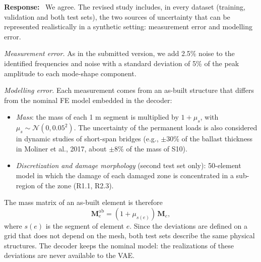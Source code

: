 \documentclass[11pt]{article}
\newenvironment{response}{\par\smallskip\noindent\color{resp}\textbf{Response:}\ }{\par}
\begin{document}
\begin{response}
We agree. The revised study includes, in every dataset (training, validation and both test sets), the two sources of
uncertainty that can be represented realistically in a synthetic setting: measurement error and modelling error.

\textit{Measurement error.} As in the submitted version, we add 2.5\% noise to the identified frequencies and noise with
a standard deviation of 5\% of the peak amplitude to each mode-shape component.

\textit{Modelling error.} Each measurement comes from an as-built structure that differs from the nominal FE model
embedded in the decoder:
\begin{itemize}[leftmargin=*]
\item \emph{Mass}: the mass of each 1 m segment is multiplied by $1+\mu_s$, with $\mu_s\sim\mathcal{N}(0,0.05^2)$. The uncertainty
of the permanent loads is also considered in dynamic studies of short-span bridges (e.g., $\pm30\%$ of the ballast thickness in
Moliner et al., 2017, about $\pm8\%$ of the mass of S10).
\item \emph{Discretization and damage morphology} (second test set only): 50-element model in which the damage of each
damaged zone is concentrated in a sub-region of the zone (R1.1, R2.3).
\end{itemize}
The mass matrix of an as-built element is therefore
\begin{equation}
\mathbf{M}_e^{\mathrm{ab}}=(1+\mu_{s(e)})\,\mathbf{M}_e,
\label{eq:asbuilt}
\end{equation}
where $s(e)$ is the segment of element $e$. Since the deviations are defined on a grid that does not depend on the mesh,
both test sets describe the same physical structures. The decoder keeps the nominal model: the realizations of these
deviations are never available to the VAE.


\end{response}
\end{document}
